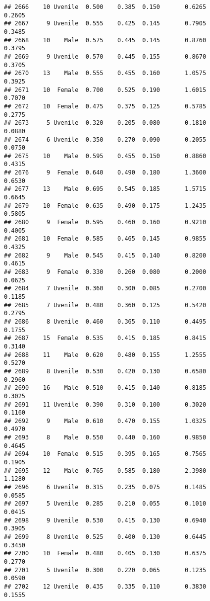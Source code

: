 \documentclass[
]{article}
\begin{document}
\begin{verbatim}
## 2666    10 Uvenile  0.500    0.385  0.150       0.6265         0.2605
## 2667     9 Uvenile  0.555    0.425  0.145       0.7905         0.3485
## 2668    10    Male  0.575    0.445  0.145       0.8760         0.3795
## 2669     9 Uvenile  0.570    0.445  0.155       0.8670         0.3705
## 2670    13    Male  0.555    0.455  0.160       1.0575         0.3925
## 2671    10  Female  0.700    0.525  0.190       1.6015         0.7070
## 2672    10  Female  0.475    0.375  0.125       0.5785         0.2775
## 2673     5 Uvenile  0.320    0.205  0.080       0.1810         0.0880
## 2674     6 Uvenile  0.350    0.270  0.090       0.2055         0.0750
## 2675    10    Male  0.595    0.455  0.150       0.8860         0.4315
## 2676     9  Female  0.640    0.490  0.180       1.3600         0.6530
## 2677    13    Male  0.695    0.545  0.185       1.5715         0.6645
## 2679    10  Female  0.635    0.490  0.175       1.2435         0.5805
## 2680     9  Female  0.595    0.460  0.160       0.9210         0.4005
## 2681    10  Female  0.585    0.465  0.145       0.9855         0.4325
## 2682     9    Male  0.545    0.415  0.140       0.8200         0.4615
## 2683     9  Female  0.330    0.260  0.080       0.2000         0.0625
## 2684     7 Uvenile  0.360    0.300  0.085       0.2700         0.1185
## 2685     7 Uvenile  0.480    0.360  0.125       0.5420         0.2795
## 2686     8 Uvenile  0.460    0.365  0.110       0.4495         0.1755
## 2687    15  Female  0.535    0.415  0.185       0.8415         0.3140
## 2688    11    Male  0.620    0.480  0.155       1.2555         0.5270
## 2689     8 Uvenile  0.530    0.420  0.130       0.6580         0.2960
## 2690    16    Male  0.510    0.415  0.140       0.8185         0.3025
## 2691    11 Uvenile  0.390    0.310  0.100       0.3020         0.1160
## 2692     9    Male  0.610    0.470  0.155       1.0325         0.4970
## 2693     8    Male  0.550    0.440  0.160       0.9850         0.4645
## 2694    10  Female  0.515    0.395  0.165       0.7565         0.1905
## 2695    12    Male  0.765    0.585  0.180       2.3980         1.1280
## 2696     6 Uvenile  0.315    0.235  0.075       0.1485         0.0585
## 2697     5 Uvenile  0.285    0.210  0.055       0.1010         0.0415
## 2698     9 Uvenile  0.530    0.415  0.130       0.6940         0.3905
## 2699     8 Uvenile  0.525    0.400  0.130       0.6445         0.3450
## 2700    10  Female  0.480    0.405  0.130       0.6375         0.2770
## 2701     5 Uvenile  0.300    0.220  0.065       0.1235         0.0590
## 2702    12 Uvenile  0.435    0.335  0.110       0.3830         0.1555

\end{verbatim}
\end{document}

